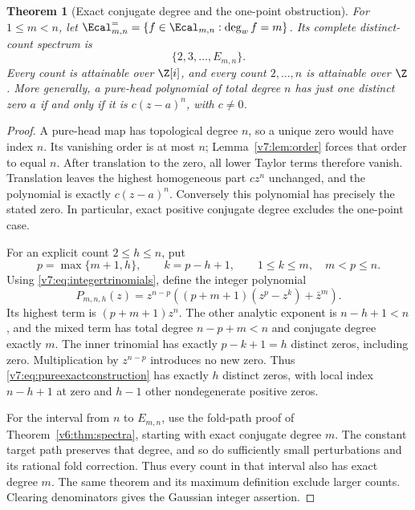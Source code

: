 \documentclass[UTF8,11pt]{ctexart}
\newtheorem{thm}{Theorem}[section]
\theoremstyle{definition}
\numberwithin{equation}{section}
\begin{document}
\begin{thm}[Exact conjugate degree and the one-point obstruction]
\label{v7:thm:pureexact}
For $1\le m<n$, let
$\Ecal^{=}_{m,n}=\{f\in\Ecal_{m,n}:\deg_w f=m\}$.
Its complete distinct-count spectrum is
\begin{equation}\label{v7:eq:pureexactspectrum}
 \{2,3,\ldots,E_{m,n}\}.
\end{equation}
Every count is attainable over $\Z[i]$, and every count
$2,\ldots,n$ is attainable over $\Z$.
More generally, a pure-head polynomial of total degree $n$
has just one distinct zero $a$ if and only if it is
$c(z-a)^n$, with $c\ne0$.
\end{thm}
\begin{proof}
A pure-head map has topological degree $n$, so a unique zero
would have index $n$. Its vanishing order is at most $n$;
Lemma~\ref{v7:lem:order} forces that order to equal $n$.
After translation to the zero, all lower Taylor terms therefore
vanish. Translation leaves the highest homogeneous part $cz^n$
unchanged, and the polynomial is exactly $c(z-a)^n$.
Conversely this polynomial has precisely the stated zero.
In particular, exact positive conjugate degree excludes the
one-point case.

For an explicit count $2\le h\le n$, put
\[
 p=\max\{m+1,h\},\qquad k=p-h+1,
 \qquad 1\le k\le m,\quad m<p\le n.
\]
Using \eqref{v7:eq:integertrinomials}, define the integer polynomial
\begin{equation}\label{v7:eq:pureexactconstruction}
 P_{m,n,h}(z)=z^{n-p}
       \left((p+m+1)(z^p-z^k)+\bar z^m\right).
\end{equation}
Its highest term is $(p+m+1)z^n$. The other analytic exponent
is $n-h+1<n$, and the mixed term has total degree
$n-p+m<n$ and conjugate degree exactly $m$.
The inner trinomial has exactly $p-k+1=h$ distinct zeros,
including zero. Multiplication by $z^{n-p}$ introduces no new
zero. Thus \eqref{v7:eq:pureexactconstruction} has exactly $h$
distinct zeros, with local index $n-h+1$ at zero and $h-1$
other nondegenerate positive zeros.

For the interval from $n$ to $E_{m,n}$, use the fold-path proof
of Theorem~\ref{v6:thm:spectra}, starting with exact conjugate
degree $m$. The constant target path preserves that degree,
and so do sufficiently small perturbations and its rational
fold correction. Thus every count in that interval also has
exact degree $m$. The same theorem and its maximum definition
exclude larger counts. Clearing denominators gives the
Gaussian integer assertion.
\end{proof}
\end{document}
